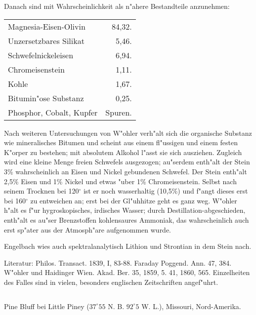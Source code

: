 \documentclass[a4paper, 11pt, oneside]{article}
\begin{document}
Danach sind mit Wahrscheinlichkeit als n"ahere Bestandteile anzunehmen:

\begin{table}[!ht]
    \centering\swabfamily\Large
    \begin{tabular}{l r}
        Magnesia-Eisen-Olivin & 84,32. \\
        Unzersetzbares Silikat  & 5,46. \\
        Schwefelnickeleisen & 6,94. \\
        Chromeisenstein & 1,11. \\
        Kohle & 1,67. \\
        Bitumin"ose Substanz & 0,25. \\
        Phosphor, Cobalt, Kupfer  & Spuren. \\
    \end{tabular}
\end{table}

Nach weiteren Untersuchungen von W"ohler verh"alt sich die organische Substanz wie mineralisches Bitumen und scheint aus einem fl"ussigen und einem festen K"orper zu bestehen; mit absolutem Alkohol l"asst sie sich ausziehen. Zugleich wird eine kleine Menge freien Schwefels ausgezogen; au"serdem enth"alt der Stein 3\% wahrscheinlich an Eisen und Nickel gebundenen Schwefel. Der Stein enth"alt 2,5\% Eisen und 1\% Nickel und etwas "uber 1\% Chromeisenstein. Selbst nach seinem Trocknen bei 120$^\circ$ ist er noch wasserhaltig (10,5\%) und f"angt dieses erst bei 160$^\circ$ zu entweichen an; erst bei der Gl"uhhitze geht es ganz weg. W"ohler h"alt es f"ur hygroskopisches, irdisches Wasser; durch Destillation-abgeschieden‚ enth"alt es au"ser Brenzstoffen kohlensaures Ammoniak, das wahrscheinlich auch erst sp"ater aus der Atmosph"are aufgenommen wurde.

Engelbach wies auch spektralanalytisch Lithion und Strontian in dem Stein nach.

\normalsize
Literatur: Philos. Transact. 1839, I, 83-88. Faraday Poggend. Ann. 47, 384. W"ohler und Haidinger Wien. Akad. Ber. 35, 1859, 5. 41, 1860, 565. Einzelheiten des Falles sind in vielen, besonders englischen Zeitschriften angef"uhrt.

\subsection{}
\LARGE
\paragraph{}
Pine Bluff bei Little Piney ($37^\circ 55$ N. B. $92^\circ 5$ W. L.), Missouri, Nord-Amerika.
\end{document}
